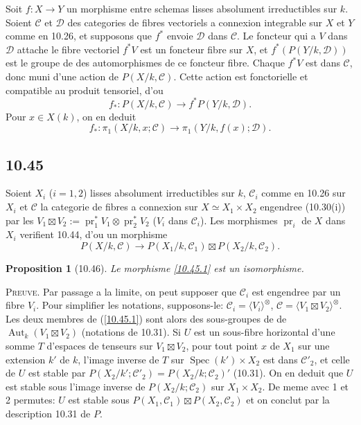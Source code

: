 \documentclass[12pt,a4paper]{article}
\theoremstyle{plain}
\newtheorem{proposition}[theorem]{Proposition}
\theoremstyle{definition}
\theoremstyle{remark}
\DeclareMathOperator{\Spec}{Spec}
\DeclareMathOperator{\Aut}{Aut}
\DeclareMathOperator{\pr}{pr}
\begin{document}
Soit $f: X \to Y$ un morphisme entre schemas lisses absolument irreductibles sur $k$. Soient $\mathcal{C}$ et $\mathcal{D}$ des categories de fibres vectoriels a connexion integrable sur $X$ et $Y$ comme en 10.26, et supposons que $f^*$ envoie $\mathcal{D}$ dans $\mathcal{C}$. Le foncteur qui a $V$ dans $\mathcal{D}$ attache le fibre vectoriel $f^* V$ est un foncteur fibre sur $X$, et $f^*(P(Y/k, \mathcal{D}))$ est le groupe de des automorphismes de ce foncteur fibre. Chaque $f^* V$ est dans $\mathcal{C}$, donc muni d'une action de $P(X/k, \mathcal{C})$. Cette action est fonctorielle et compatible au produit tensoriel, d'ou
\begin{equation}\label{10.44.1}
f_*: P(X/k, \mathcal{C}) \longrightarrow f^* P(Y/k, \mathcal{D}). \tag{10.44.1}
\end{equation}
Pour $x \in X(k)$, on en deduit
\begin{equation}\label{10.44.2}
f_*: \pi_1(X/k, x; \mathcal{C}) \longrightarrow \pi_1(Y/k, f(x); \mathcal{D}). \tag{10.44.2}
\end{equation}

\subsection*{10.45}

Soient $X_i$ ($i = 1, 2$) lisses absolument irreductibles sur $k$, $\mathcal{C}_i$ comme en 10.26 sur $X_i$ et $\mathcal{C}$ la categorie de fibres a connexion sur $X \simeq X_1 \times X_2$ engendree (10.30(i)) par les $V_1 \boxtimes V_2 := \pr_1^* V_1 \otimes \pr_2^* V_2$ ($V_i$ dans $\mathcal{C}_i$). Les morphismes $\pr_i$ de $X$ dans $X_i$ verifient 10.44, d'ou un morphisme
\begin{equation}\label{10.45.1}
P(X/k, \mathcal{C}) \longrightarrow P(X_1/k, \mathcal{C}_1) \boxtimes P(X_2/k, \mathcal{C}_2). \tag{10.45.1}
\end{equation}

\begin{proposition}[10.46]
Le morphisme \ref{10.45.1} est un isomorphisme.
\end{proposition}

\textsc{Preuve.} Par passage a la limite, on peut supposer que $\mathcal{C}_i$ est engendree par un fibre $V_i$. Pour simplifier les notations, supposons-le: $\mathcal{C}_i = \langle V_i \rangle^{\otimes}$, $\mathcal{C} = \langle V_1 \boxtimes V_2 \rangle^{\otimes}$. Les deux membres de (\ref{10.45.1}) sont alors des sous-groupes de de $\Aut_k(V_1 \boxtimes V_2)$ (notations de 10.31). Si $U$ est un sous-fibre horizontal d'une somme $T$ d'espaces de tenseurs sur $V_1 \boxtimes V_2$, pour tout point $x$ de $X_1$ sur une extension $k'$ de $k$, l'image inverse de $T$ sur $\Spec(k') \times X_2$ est dans $\mathcal{C}'_2$, et celle de $U$ est stable par $P(X_2/k'; \mathcal{C}'_2) = P(X_2/k; \mathcal{C}_2)'$ (10.31). On en deduit que $U$ est stable sous l'image inverse de $P(X_2/k; \mathcal{C}_2)$ sur $X_1 \times X_2$. De meme avec 1 et 2 permutes: $U$ est stable sous $P(X_1, \mathcal{C}_1) \boxtimes P(X_2, \mathcal{C}_2)$ et on conclut par la description 10.31 de $P$.
\end{document}
